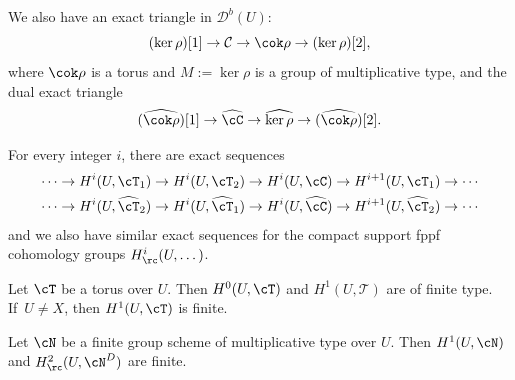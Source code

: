 We also have an exact triangle in ${\mathcal D}^b(U)$:
\begin{equation} \label{devistm}
(\ker \rho)[1] \to \mathcal C \to \cok \rho \to (\ker \rho)[2],
\end{equation}
where $\cok \rho$ is a torus and $M:=\ker \rho$ is a group of multiplicative
type, and the dual exact triangle
\begin{equation} \label{devistmbis}
(\widehat{\cok \rho})[1] \to \widehat \cC \to \widehat{\ker \rho}
\to (\widehat{\cok \rho})[2].
\end{equation}

For every integer $i$, there are exact sequences
\begin{gather} \label{devis1}
\cdots\to H^i(U,\cT_1) \to H^i(U,\cT_2) \to
H^i(U,\cC) \to H^{i+1}(U,\cT_1) \to\cdots\\
\label{devis2}
\cdots\to H^i(U,\widehat \cT_2) \to H^i(U,\widehat \cT_1) \to
H^i(U,\widehat \cC) \to H^{i+1}(U,\widehat \cT_2) \to\cdots
\end{gather}
and we also have similar exact sequences for the compact support fppf
cohomology groups $H^i_\rc(U,\dots)$.

\skpt
\begin{lem} \label{fini1}
\begin{enumeratea}
\item\label{fini1a}
Let $\cT$ be a torus over $U$. Then
$H^0(U,\cT)$ and $H^1(U,\mathcal T)$
are of finite type. If~$U \neq X$, then
$H^1(U,\cT)$ is finite.

\item\label{fini1b}
Let $\cN$ be a finite group scheme of multiplicative type over
$U$. Then $H^1(U,\cN)$ and $H^2_\rc(U,\cN^D)$ are finite.
\end{enumeratea}
\end{lem}

